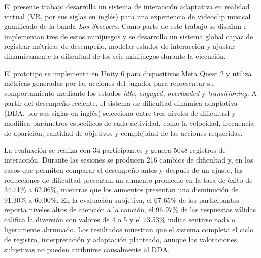 El presente trabajo desarrolla un sistema de interacción adaptativa en 
realidad virtual (VR, por sus siglas en inglés) para una experiencia de 
videoclip musical gamificado de la banda \textit{Los Skeepers}. Como 
parte de este trabajo se diseñan e implementan tres de estos minijuegos 
y se desarrolla un sistema global capaz de registrar métricas de 
desempeño, modelar estados de interacción y ajustar dinámicamente la 
dificultad de los seis minijuegos durante la ejecución.

El prototipo se implementa en Unity 6 para dispositivos Meta Quest 2 y 
utiliza métricas generadas por las acciones del jugador para representar 
su comportamiento mediante los estados \textit{idle}, \textit{engaged}, 
\textit{overloaded} y \textit{transitioning}. A partir del desempeño 
reciente, el sistema de dificultad dinámica adaptativa (DDA, por sus 
siglas en inglés) selecciona entre tres niveles de dificultad y modifica 
parámetros específicos de cada actividad, como la velocidad, frecuencia 
de aparición, cantidad de objetivos y complejidad de las acciones 
requeridas.

La evaluación se realiza con 34 participantes y genera 5048 registros de 
interacción. Durante las sesiones se producen 216 cambios de dificultad 
y, en los casos que permiten comparar el desempeño antes y después de un 
ajuste, las reducciones de dificultad presentan un aumento promedio en 
la tasa de éxito de 34.71\% a 62.06\%, mientras que los aumentos 
presentan una disminución de 91.30\% a 60.00\%. En la evaluación 
subjetiva, el 67.65\% de los participantes reporta niveles altos de 
atención a la canción, el 96.97\% de las respuestas válidas califica la 
diversión con valores de 4 o 5 y el 73.53\% indica sentirse nada o 
ligeramente abrumado. Los resultados muestran que el sistema completa el 
ciclo de registro, interpretación y adaptación planteado, aunque las 
valoraciones subjetivas no pueden atribuirse causalmente al DDA.
